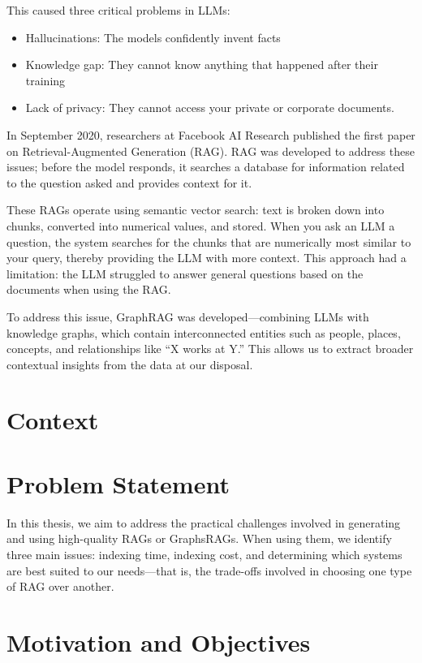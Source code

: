 \documentclass[12pt,a4paper]{report}
\begin{document}
\bigbreak
\noindent This caused three critical problems in LLMs:
\begin{itemize}
    \item  Hallucinations: The models confidently invent facts
    \item  Knowledge gap: They cannot know anything that happened after their training
    \item Lack of privacy: They cannot access your private or corporate documents.
\end{itemize}

In September 2020, researchers at Facebook AI 
Research published the first paper on 
Retrieval-Augmented Generation (RAG). 
RAG was developed to address these issues; 
before the model responds, it searches a database 
for information related to the question asked and 
provides context for it.

\bigbreak
These RAGs operate using semantic vector search: 
text is broken down into chunks, converted into 
numerical values, and stored. When you ask an LLM a 
question, the system searches for the chunks that are 
numerically most similar to your query, thereby 
providing the LLM with more context. This approach had a 
limitation: the LLM struggled to answer general questions 
based on the documents when using the RAG.

\bigbreak
To address this issue, GraphRAG was developed—combining 
LLMs with knowledge graphs, which contain interconnected
entities such as people, places, concepts, and 
relationships like “X works at Y.” This allows us 
to extract broader contextual insights from the data 
at our disposal.

\section{Context}

\section{Problem Statement}

In this thesis, we aim to address the practical 
challenges involved in generating and using 
high-quality RAGs or GraphsRAGs. 
When using them, we identify three main issues: 
indexing time, indexing cost, and determining 
which systems are best suited to our needs—that is, 
the trade-offs involved in choosing one type of 
RAG over another.

\section{Motivation and Objectives}
\end{document}
